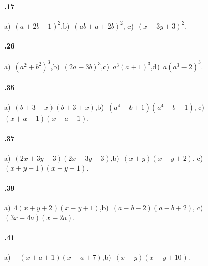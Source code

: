 \paragraph{\thechapter.17}
a)~$(a+2b-1)^{2}$,\quad b)~$(ab+a+2b)^{2}$, \quad c)~$(x-3y+3)^{2}$.

\paragraph{\thechapter.26}
a)~$\left(a^{2}+b^{2}\right)^{3}$,\quad b)~$(2a-3b)^{3}$,\quad c)~$a^{3}(a+1)^{3}$,\quad d)~$a\left(a^3-2\right)^3$.

\paragraph{\thechapter.35}
a)~$(b+3-x)(b+3+x)$,\quad b)~$(a^{4}-b+1)(a^{4}+b-1)$, \quad c)~$(x+a-1)(x-a-1)$.

\paragraph{\thechapter.37}
a)~$(2x+3y-3)(2x-3y-3)$,\quad b)~$(x+y)(x-y+2)$, \quad c)~$(x+y+1)(x-y+1)$.

\paragraph{\thechapter.39}
a)~$4(x+y+2)(x-y+1)$,\quad b)~$(a-b-2)(a-b+2)$, \quad c)~$(3x-4a)(x-2a)$.

\paragraph{\thechapter.41}
a)~$-(x+a+1)(x-a+7)$,\quad b)~$(x+y)(x-y+10)$.
